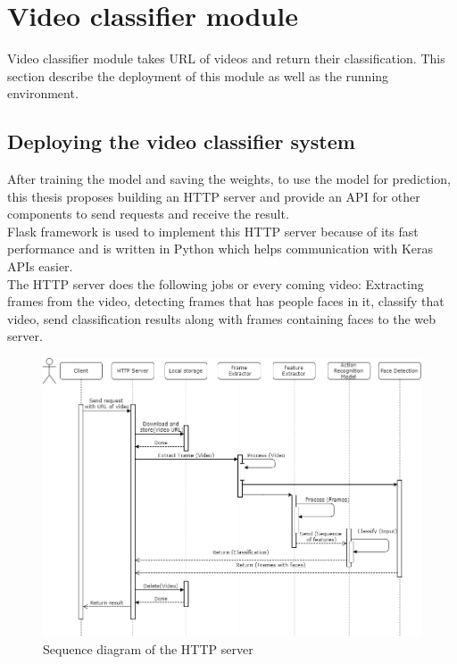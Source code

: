 \section{Video classifier module}
Video classifier module takes URL of videos and return their classification. This section describe the deployment of this module as well as the running environment.
\subsection{Deploying the video classifier system}
After training the model and saving the weights, to use the model for prediction, this thesis proposes building an HTTP server and provide an API for other components to send requests and receive the result. \\
Flask framework is used to implement this HTTP server because of its fast performance and is written in Python which helps communication with Keras APIs easier. \\
The HTTP server does the following jobs or every coming video: Extracting frames from the video, detecting frames that has people faces in it, classify that video, send classification results along with frames containing faces to the web server.
\begin{center}
    \begin{figure}[H]
    \centering
    \includegraphics[width=1\columnwidth]{images/chap4/server_sequence.png}
    \caption{Sequence diagram of the HTTP server}
    \end{figure}
\end{center}
